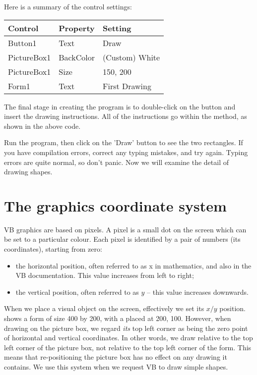 		Here is a summary of the control settings:
		\begin{center}
			\begin{tabular}{lll}
				\toprule Control & Property & Setting\\ \midrule
				Button1	& Text&	Draw\\
				PictureBox1	& BackColor &	(Custom)  White \\
				PictureBox1 &	Size &	150, 200 \\
				Form1 &	Text &	First Drawing\\ \bottomrule
			\end{tabular}
		\end{center}

 
		The final stage in creating the program is to double-click on the button and insert the drawing instructions. All of the instructions go within the  method, as shown in the above code.

		Run the program, then click on the 'Draw' button to see the two rectangles. If you have compilation errors, correct any typing mistakes, and try again. Typing errors are quite normal, so don't panic.
Now we will examine the detail of drawing shapes.

	\section{The graphics coordinate system}
		VB graphics are based on pixels. A pixel is a small dot on the screen which can be set to a particular colour. Each pixel is identified by a pair of numbers (its coordinates), starting from zero:
		\begin{itemize}
			\item the horizontal position, often referred to as x in mathematics, and also in the VB documentation. This value increases from left to right;
			\item the vertical position, often referred to as $y$ – this value increases downwards.
		\end{itemize}
		When we place a visual object on the screen, effectively we set its $x/y$ position.  shows a form of size 400 by 200, with a  placed at 200, 100. However, when drawing on the picture box, we regard \emph{its} top left corner as being the zero point of horizontal and vertical coordinates. In other words, we draw relative to the top left corner of the picture box, not relative to the top left corner of the form. This means that re-positioning the picture box has no effect on any drawing it contains. We use this system when we request VB to draw simple shapes.

